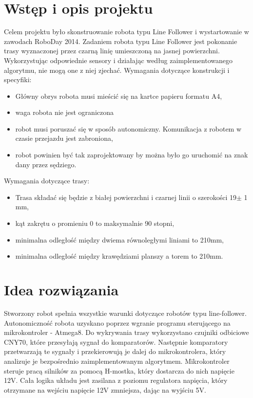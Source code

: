 \documentclass[11pt,a4paper]{article}
\begin{document}
\section{Wstęp i opis projektu}
Celem projektu było skonstruowanie robota typu Line Follower i wystartowanie w zawodach RoboDay 2014.
Zadaniem robota typu Line Follower jest pokonanie trasy wyznaczonej przez czarną linię umieszczoną na jasnej powierzchni. Wykorzystując odpowiednie sensory i działając według zaimplementowanego algorytmu, nie mogą one z niej zjechać.
\newline Wymagania dotyczące konstrukcji i specyfiki:
\begin{itemize}
  \item Główny obrys robota musi mieścić się na kartce papieru formatu A4,
  \item waga robota nie jest ograniczona
  \item robot musi poruszać się w sposób autonomiczny. Komunikacja z robotem w czasie przejazdu jest zabroniona,
  \item robot powinien być tak zaprojektowany by można było go uruchomić na znak dany przez sędziego.
\end{itemize}
Wymagania dotyczące trasy:
\begin{itemize}
  \item Trasa składać się będzie z białej powierzchni i czarnej linii o szerokości 19$\pm$ 1 mm,
  \item kąt zakrętu o promieniu 0 to maksymalnie 90 stopni,
  \item minimalna odległość między dwiema równoległymi liniami to 210mm,
  \item minimalna odległość między krawędziami planszy a torem to 210mm.
\end{itemize}
\section{Idea rozwiązania}
Stworzony robot spełnia wszystkie warunki dotyczące robotów typu line-follower.
Autonomiczność robota uzyskano poprzez wgranie programu sterującego na mikrokontroler - Atmega8. 
Do wykrywania trasy wykorzystano czujniki odbiciowe CNY70, które przesyłają sygnał do komparatorów.
Następnie komparatory przetwarzają te sygnały i przekierowują je dalej do mikrokontrolera, który analizuje je bezpośrednio zaimplementowanym algorytmem. 
Mikrokontroler steruje pracą silników za pomocą H-mostka, który dostarcza do nich napięcie 12V.
Cała logika układu jest zasilana z poziomu regulatora napięcia, który otrzymane na wejściu napięcie 12V zmniejsza, dając na wyjściu 5V. 
\end{document}
